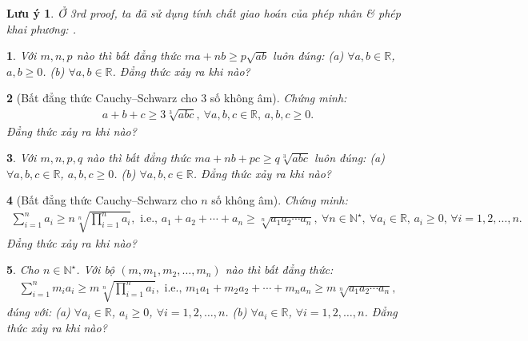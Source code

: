 \documentclass{article}
\newtheorem{baitoan}{}
\newtheorem{luuy}{Lưu ý}
\begin{document}
\begin{luuy}
	Ở 3rd proof, ta đã sử dụng tính chất giao hoán của phép nhân \& phép khai phương: .
\end{luuy}

\begin{baitoan}
	Với $m,n,p$ nào thì bất đẳng thức $ma + nb\ge p\sqrt{ab}$ luôn đúng: (a) $\forall a,b\in\mathbb{R}$, $a,b\ge0$. (b) $\forall a,b\in\mathbb{R}$. Đẳng thức xảy ra khi nào?
\end{baitoan}

\begin{baitoan}[Bất đẳng thức Cauchy--Schwarz cho 3 số không âm]
	Chứng minh:
	\begin{align*}
		\boxed{a + b + c\ge3\sqrt[3]{abc},\ \forall a,b,c\in\mathbb{R},\,a,b,c\ge 0.}
	\end{align*}
	Đẳng thức xảy ra khi nào?
\end{baitoan}

\begin{baitoan}
	Với $m,n,p,q$ nào thì bất đẳng thức $ma + nb + pc\ge q\sqrt[3]{abc}$ luôn đúng: (a) $\forall a,b,c\in\mathbb{R}$, $a,b,c\ge0$. (b) $\forall a,b,c\in\mathbb{R}$. Đẳng thức xảy ra khi nào?
\end{baitoan}

\begin{baitoan}[Bất đẳng thức Cauchy--Schwarz cho $n$ số không âm]
	Chứng minh:
	\begin{align*}
		\sum_{i=1}^n a_i\ge n\sqrt[n]{\prod_{i=1}^n a_i},\mbox{ i.e., } a_1 + a_2 + \cdots + a_n\ge\sqrt[n]{a_1a_2\cdots a_n},\ \forall n\in\mathbb{N}^\star,\ \forall a_i\in\mathbb{R},\,a_i\ge0,\,\forall i = 1,2,\ldots,n.
	\end{align*}
	Đẳng thức xảy ra khi nào?
\end{baitoan}

\begin{baitoan}
	Cho $n\in\mathbb{N}^\star$. Với bộ $(m,m_1,m_2,\ldots,m_n)$ nào thì bất đẳng thức:
	\begin{align*}
		\sum_{i=1}^n m_ia_i\ge m\sqrt[n]{\prod_{i=1}^n a_i},\mbox{ i.e., } m_1a_1 + m_2a_2 + \cdots + m_na_n\ge m\sqrt[n]{a_1a_2\cdots a_n},
	\end{align*}
	đúng với: (a) $\forall a_i\in\mathbb{R}$, $a_i\ge0$, $\forall i = 1,2,\ldots,n$. (b) $\forall a_i\in\mathbb{R}$, $\forall i = 1,2,\ldots,n$.
	Đẳng thức xảy ra khi nào?
\end{baitoan}
\end{document}

